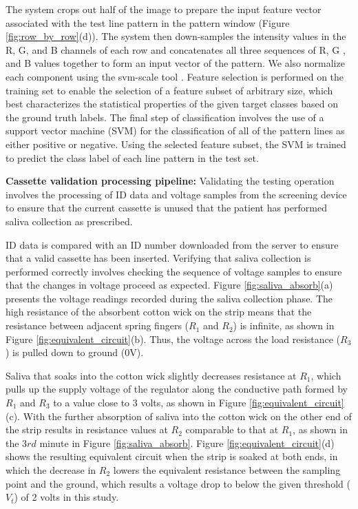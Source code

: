 The system crops out half of the image to prepare the input feature vector associated with the test line pattern in the pattern window (Figure \ref{fig:row_by_row}(d)). The system then down-samples the intensity values in the R, G, and B channels of each row and concatenates all three sequences of R, G , and B values together to form an input vector of the pattern. We also normalize each component using the svm-scale tool \cite{Chang:2011}. Feature selection is performed on the training set to enable the selection of a feature subset of arbitrary size, which best characterizes the statistical properties of the given target classes based on the ground truth labels. The final step of classification involves the use of a support vector machine (SVM) \cite{Chang:2011} for the classification of  all of the pattern lines as either positive or negative. Using the selected feature subset, the SVM is trained to predict the class label of each line pattern in the test set.

\textbf{Cassette validation processing pipeline:}
\newline
Validating the testing operation involves the processing of ID data and voltage samples from the screening device to ensure that the current cassette is unused that the patient has performed saliva collection as prescribed.


ID data is compared with an ID number downloaded from the server to ensure that a valid cassette has been inserted. Verifying that saliva collection is performed correctly involves checking the sequence of voltage samples to ensure that the changes in voltage proceed as expected. Figure \ref{fig:saliva_absorb}(a) presents the voltage readings recorded during the saliva collection phase. The high resistance of the absorbent cotton wick on the strip means that the resistance between adjacent spring fingers ($R_1$ and $R_2$) is infinite, as shown in Figure \ref{fig:equivalent_circuit}(b). Thus, the voltage across the load resistance ($R_3$) is pulled down to ground (0V).


Saliva that soaks into the cotton wick slightly decreases resistance at $R_1$, which pulls up the supply voltage of the regulator along the conductive path formed by $R_1$ and $R_3$ to a value close to 3 volts, as shown in Figure \ref{fig:equivalent_circuit}(c). With the further absorption of saliva into the cotton wick on the other end of the strip results in resistance values at $R_2$ comparable to that at $R_1$, as shown in the 3$rd$ minute in Figure \ref{fig:saliva_absorb}. Figure \ref{fig:equivalent_circuit}(d) shows the resulting equivalent circuit when the strip is soaked at both ends, in which the decrease in $R_2$ lowers the equivalent resistance between the sampling point and the ground, which results a voltage drop to below the given threshold ($V_t$) of 2 volts in this study. 

